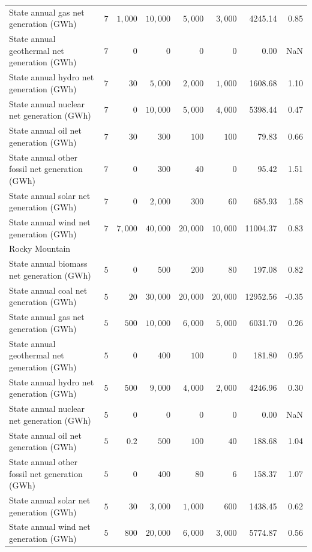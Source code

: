\documentclass[
]{article}
\begin{document}
\begin{longtable}{lrrrrrrr}
State annual gas net generation (GWh) & $7$ & $1,000$ & $10,000$ & $5,000$ & $3,000$ & 4245.14 & 0.85 \\ 
State annual geothermal net generation (GWh) & $7$ & $0$ & $0$ & $0$ & $0$ & 0.00 & NaN \\ 
State annual hydro net generation (GWh) & $7$ & $30$ & $5,000$ & $2,000$ & $1,000$ & 1608.68 & 1.10 \\ 
State annual nuclear net generation (GWh) & $7$ & $0$ & $10,000$ & $5,000$ & $4,000$ & 5398.44 & 0.47 \\ 
State annual oil net generation (GWh) & $7$ & $30$ & $300$ & $100$ & $100$ & 79.83 & 0.66 \\ 
State annual other fossil net generation (GWh) & $7$ & $0$ & $300$ & $40$ & $0$ & 95.42 & 1.51 \\ 
State annual solar net generation (GWh) & $7$ & $0$ & $2,000$ & $300$ & $60$ & 685.93 & 1.58 \\ 
State annual wind net generation (GWh) & $7$ & $7,000$ & $40,000$ & $20,000$ & $10,000$ & 11004.37 & 0.83 \\ 
\midrule
\multicolumn{8}{l}{Rocky Mountain} \\ 
\midrule
State annual biomass net generation (GWh) & $5$ & $0$ & $500$ & $200$ & $80$ & 197.08 & 0.82 \\ 
State annual coal net generation (GWh) & $5$ & $20$ & $30,000$ & $20,000$ & $20,000$ & 12952.56 & -0.35 \\ 
State annual gas net generation (GWh) & $5$ & $500$ & $10,000$ & $6,000$ & $5,000$ & 6031.70 & 0.26 \\ 
State annual geothermal net generation (GWh) & $5$ & $0$ & $400$ & $100$ & $0$ & 181.80 & 0.95 \\ 
State annual hydro net generation (GWh) & $5$ & $500$ & $9,000$ & $4,000$ & $2,000$ & 4246.96 & 0.30 \\ 
State annual nuclear net generation (GWh) & $5$ & $0$ & $0$ & $0$ & $0$ & 0.00 & NaN \\ 
State annual oil net generation (GWh) & $5$ & $0.2$ & $500$ & $100$ & $40$ & 188.68 & 1.04 \\ 
State annual other fossil net generation (GWh) & $5$ & $0$ & $400$ & $80$ & $6$ & 158.37 & 1.07 \\ 
State annual solar net generation (GWh) & $5$ & $30$ & $3,000$ & $1,000$ & $600$ & 1438.45 & 0.62 \\ 
State annual wind net generation (GWh) & $5$ & $800$ & $20,000$ & $6,000$ & $3,000$ & 5774.87 & 0.56 \\ 

\end{longtable}
\end{document}
